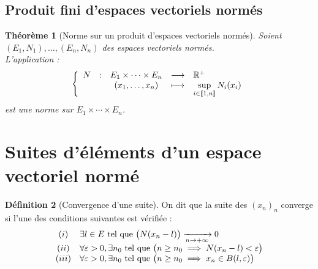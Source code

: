 \documentclass[11pt,a4paper]{report}
\newtheorem{theorem}{Théorème}[chapter]
\theoremstyle{definition}
\newtheorem{dfn}[theorem]{Définition}
\begin{document}
\subsection{Produit fini d'espaces vectoriels normés} %
\label{sub:produit_fini_d_espaces_vectoriels_normes}
\begin{theorem}[Norme sur un produit d'espaces vectoriels normés]
\label{thm:norme_produit}
     Soient $(E_1,N_1), \ldots , (E_n, N_n)$ des espaces vectoriels normés.\\
     L'application : 
     \begin{equation}
     \left\lbrace \begin{array}{r c c c l}
          N &:& E_1 \times \cdots \times E_n &\longrightarrow & \ensuremath{\mathbb{R}}^+ \\
            & & (x_1, \ldots , x_n) &\longmapsto & \displaystyle\sup_{i\in \llbracket 1,n\rrbracket} N_i (x_i)
     \end{array}\right.
     \end{equation}
     est une norme sur $E_1 \times \cdots \times E_n$.     
\end{theorem}

\section{Suites d'éléments d'un espace vectoriel normé} %
\label{sec:suites_evn}
\begin{dfn}[Convergence d'une suite]
    On dit que la suite des $(x_n)_n $ converge si l'une des conditions suivantes est vérifiée : 
    \begin{equation}
    \begin{array}{c l }
    (i) & \exists l \in E \text{ tel que } \big(N(x_n - l) \big) \xrightarrow[n\to +\infty]{} 0 \\
    (ii) & \forall \varepsilon > 0, \exists n_0 \text{ tel que } \big( n \geq n_0 \implies N(x_n - l) < \varepsilon \big) \\
    (iii) & \forall \varepsilon > 0, \exists n_0 \text{ tel que } \big( n \geq n_0 \implies x_n \in B(l,\varepsilon) \big)
    \end{array}
    \end{equation}
\end{dfn}
\end{document}
